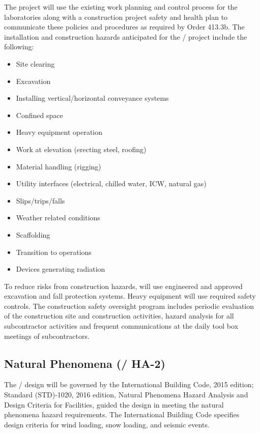 The project will use the existing work planning and
control process for the laboratories along with a construction project safety and health
plan to communicate these policies and procedures as required by 
Order 413.3b. The installation and construction hazards
anticipated for the / project include the following:
\begin{itemize}
 \item Site clearing
 \item Excavation
 \item Installing vertical/horizontal conveyance systems
 \item Confined space
 \item Heavy equipment operation
 \item Work at elevation (erecting steel, roofing)
 \item Material handling (rigging)
 \item Utility interfaces (electrical, chilled water, ICW, natural gas)
 \item Slips/trips/falls
 \item Weather related conditions
 \item Scaffolding
 \item Transition to operations
 \item Devices generating radiation
\end{itemize}

To reduce risks from construction hazards, \fnal will use engineered
and approved excavation and fall protection systems.  Heavy equipment
will use required safety controls. The \fnal construction safety
oversight program includes periodic evaluation of the construction
site and construction activities, hazard analysis for all
subcontractor activities and frequent  communications at
the daily tool box meetings of subcontractors.

\subsection{Natural Phenomena (/ HA-2)}

The / design will be governed by the
International Building Code, 2015 edition;  Standard
(STD)-1020, 2016 edition, Natural Phenomena Hazard Analysis and Design
Criteria for  Facilities, guided the design in meeting the
natural phenomena hazard requirements.  The International Building
Code specifies design criteria for wind loading, snow loading, and
seismic events.

